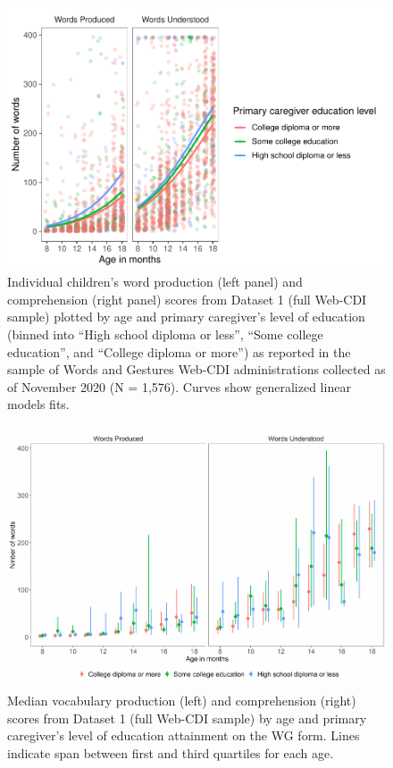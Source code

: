 \documentclass[
  english,
  ,man,floatsintext]{apa6}
\begin{document}
\begin{figure}
\centering
\includegraphics{webcdi_paper_files/figure-latex/wgglm-1.pdf}
\caption{\label{fig:wgglm}Individual children's word production (left panel) and comprehension (right panel) scores from Dataset 1 (full Web-CDI sample) plotted by age and primary caregiver's level of education (binned into \enquote{High school diploma or less}, \enquote{Some college education}, and \enquote{College diploma or more}) as reported in the sample of Words and Gestures Web-CDI administrations collected as of November 2020 (N = 1,576). Curves show generalized linear models fits.}
\end{figure}

\begin{figure}
\centering
\includegraphics{webcdi_paper_files/figure-latex/wgmedfig-1.pdf}
\caption{\label{fig:wgmedfig}Median vocabulary production (left) and comprehension (right) scores from Dataset 1 (full Web-CDI sample) by age and primary caregiver's level of education attainment on the WG form. Lines indicate span between first and third quartiles for each age.}
\end{figure}
\end{document}
